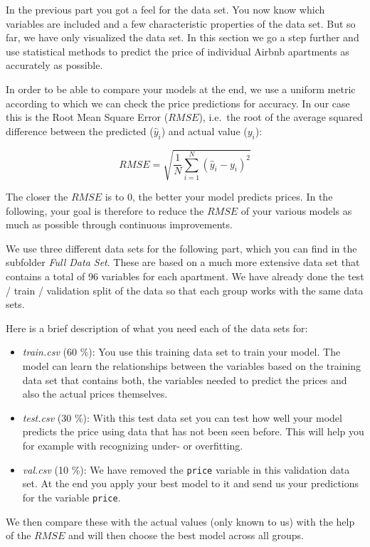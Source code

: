 \documentclass[
  11pt,
]{book}
\begin{document}
In the previous part you got a feel for the data set. You now know which
variables are included and a few characteristic properties of the data
set. But so far, we have only visualized the data set. In this section
we go a step further and use statistical methods to predict the price of
individual Airbnb apartments as accurately as possible.

In order to be able to compare your models at the end, we use a uniform
metric according to which we can check the price predictions for
accuracy. In our case this is the Root Mean Square Error (\(RMSE\)),
i.e.~the root of the average squared difference between the predicted
(\(\hat{y}_i\)) and actual value (\(y_i\)):

\[ RMSE = \sqrt{\frac{1}{N}\sum_{i=1}^{N}{(\hat{y}_i-y_i)^2}} \]

The closer the \(RMSE\) is to 0, the better your model predicts prices.
In the following, your goal is therefore to reduce the \(RMSE\) of your
various models as much as possible through continuous improvements.

We use three different data sets for the following part, which you can
find in the subfolder \emph{Full Data Set}. These are based on a much
more extensive data set that contains a total of 96 variables for each
apartment. We have already done the test / train / validation split of
the data so that each group works with the same data sets.

Here is a brief description of what you need each of the data sets for:

\begin{itemize}
\item
  \emph{train.csv} (60 \%): You use this training data set to train your
  model. The model can learn the relationships between the variables
  based on the training data set that contains both, the variables
  needed to predict the prices and also the actual prices themselves.
\item
  \emph{test.csv} (30 \%): With this test data set you can test how well
  your model predicts the price using data that has not been seen
  before. This will help you for example with recognizing under- or
  overfitting.
\item
  \emph{val.csv} (10 \%): We have removed the \texttt{price} variable in
  this validation data set. At the end you apply your best model to it
  and send us your predictions for the variable \texttt{price}.
\end{itemize}

We then compare these with the actual values (only known to us) with the
help of the \(RMSE\) and will then choose the best model across all
groups.
\end{document}
